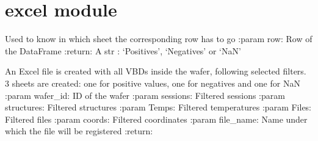 \documentclass[letterpaper,10pt,english]{sphinxmanual}
\begin{document}
\sphinxstepscope


\chapter{excel module}
\label{\detokenize{excel:module-excel}}\label{\detokenize{excel:excel-module}}\label{\detokenize{excel::doc}}

\begin{fulllineitems}
\label{\detokenize{excel:excel.classify_row}}
\pysigstartsignatures
{}
\pysigstopsignatures
\sphinxAtStartPar
Used to know in which sheet the corresponding row has to go
:param row: Row of the DataFrame
:return: A str : ‘Positives’, ‘Negatives’ or ‘NaN’

\end{fulllineitems}


\begin{fulllineitems}
\label{\detokenize{excel:excel.excel_VBD}}
\pysigstartsignatures
{}
\pysigstopsignatures
\sphinxAtStartPar
An Excel file is created with all VBDs inside the wafer, following selected filters.
3 sheets are created: one for positive values, one for negatives and one for NaN
:param wafer\_id: ID of the wafer
:param sessions: Filtered sessions
:param structures: Filtered structures
:param Temps: Filtered temperatures
:param Files: Filtered files
:param coords: Filtered coordinates
:param file\_name: Name under which the file will be registered
:return:

\end{fulllineitems}

\end{document}
